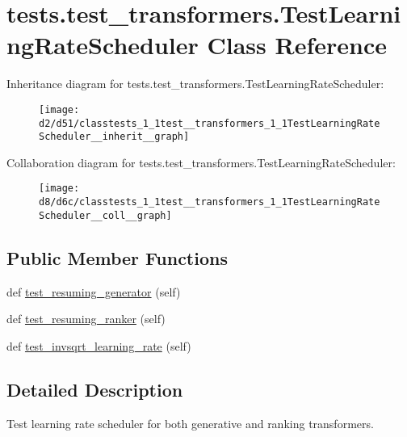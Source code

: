\hypertarget{classtests_1_1test__transformers_1_1TestLearningRateScheduler}{}\section{tests.\+test\+\_\+transformers.\+Test\+Learning\+Rate\+Scheduler Class Reference}
\label{classtests_1_1test__transformers_1_1TestLearningRateScheduler}


Inheritance diagram for tests.\+test\+\_\+transformers.\+Test\+Learning\+Rate\+Scheduler\+:
\nopagebreak
\begin{figure}[H]
\begin{center}
\leavevmode
\texttt{[image: d2/d51/classtests\_1\_1test\_\_transformers\_1\_1TestLearningRateScheduler\_\_inherit\_\_graph]}
\end{center}
\end{figure}


Collaboration diagram for tests.\+test\+\_\+transformers.\+Test\+Learning\+Rate\+Scheduler\+:
\nopagebreak
\begin{figure}[H]
\begin{center}
\leavevmode
\texttt{[image: d8/d6c/classtests\_1\_1test\_\_transformers\_1\_1TestLearningRateScheduler\_\_coll\_\_graph]}
\end{center}
\end{figure}
\subsection*{Public Member Functions}
\begin{DoxyCompactItemize}
\item 
def \hyperlink{classtests_1_1test__transformers_1_1TestLearningRateScheduler_a8c89a354321034bd5717b8e1907cbfeb}{test\+\_\+resuming\+\_\+generator} (self)
\item 
def \hyperlink{classtests_1_1test__transformers_1_1TestLearningRateScheduler_a1f6f7d394258d2170c3005e6dffae8a7}{test\+\_\+resuming\+\_\+ranker} (self)
\item 
def \hyperlink{classtests_1_1test__transformers_1_1TestLearningRateScheduler_aecccd2d60496f6fcd1fd94846fc5ac3c}{test\+\_\+invsqrt\+\_\+learning\+\_\+rate} (self)
\end{DoxyCompactItemize}


\subsection{Detailed Description}
\begin{DoxyVerb}Test learning rate scheduler for both generative and ranking transformers.
\end{DoxyVerb}
 

